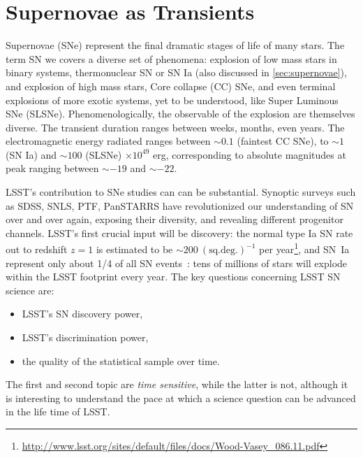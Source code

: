 %
%
%

\section{Supernovae as Transients}
\def\secname{\chpname:SNtransients}\label{sec:\secname}


Supernovae (SNe) represent the final dramatic stages of life of many
stars. The term SN we covers a diverse set of phenomena: explosion of
low mass stars in binary systems, thermonuclear SN or SN Ia (also
discussed in \autoref{sec:supernovae}), and explosion of high mass stars,
Core collapse (CC) SNe, and even terminal explosions of more exotic
systems, yet to be understood, like Super Luminous SNe
(SLSNe). Phenomenologically, the observable of the explosion are
themselves diverse. The transient duration ranges between weeks,
months, even years. The electromagnetic energy radiated ranges between
$\sim0.1$ (faintest CC SNe), to $\sim1$ (SN Ia) and $\sim100$ (SLSNe)
$\times 10^{49}$ erg, corresponding to absolute magnitudes at peak
ranging between $\sim-19$ and $\sim-22$.

LSST's contribution to SNe studies can can be substantial. Synoptic
surveys such as SDSS, SNLS, PTF, PanSTARRS have revolutionized our
understanding of SN over and over again, exposing their diversity,
and revealing different progenitor channels. LSST's first crucial
input will be discovery: the normal type Ia SN rate out to redshift
$z=1$ is estimated to be $\sim200 ~(\mathrm{sq. deg.})^{-1}$ per
year\footnote{\url{http://www.lsst.org/sites/default/files/docs/Wood-Vasey_086.11.pdf}},
and SN~Ia represent only about 1/4 of all SN
events~\citep{Li11b}: tens of millions of stars will explode
within the LSST footprint every year. The key questions concerning
LSST SN science are:
\begin{itemize}
\item
LSST's SN discovery power,
\item
LSST's discrimination power,
\item
the quality of the statistical sample over time.
\end{itemize}
The first and second topic are \emph{time sensitive}, while the latter
is not, although it is interesting to understand the pace at which a
science question can be advanced in the life time of LSST.


